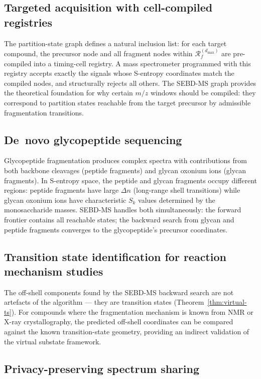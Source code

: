 \documentclass[twocolumn,10pt,a4paper]{article}
\theoremstyle{thmstyle}
\theoremstyle{definition}
\theoremstyle{remark}
\newcommand{\Sk}{S_{k}}
\newcommand{\Reachf}{\mathcal{R}_f}
\begin{document}
\subsection{Targeted acquisition with cell-compiled registries}

The partition-state graph defines a natural inclusion list: for each
target compound, the precursor node and all fragment nodes within
$\Reachf^{(d_\text{max})}$ are pre-compiled into a timing-cell registry.
A mass spectrometer programmed with this registry accepts exactly the
signals whose S-entropy coordinates match the compiled nodes, and
structurally rejects all others. The SEBD-MS graph provides the
theoretical foundation for why certain $m/z$ windows should be compiled:
they correspond to partition states reachable from the target precursor
by admissible fragmentation transitions.

\subsection{De~novo glycopeptide sequencing}

Glycopeptide fragmentation produces complex spectra with contributions
from both backbone cleavages (peptide fragments) and glycan oxonium
ions (glycan fragments). In S-entropy space, the peptide and glycan
fragments occupy different regions: peptide fragments have large $\Delta n$
(long-range shell transitions) while glycan oxonium ions have
characteristic $\Sk$ values determined by the monosaccharide masses.
SEBD-MS handles both simultaneously: the forward frontier contains all
reachable states; the backward search from glycan and peptide fragments
converges to the glycopeptide's precursor coordinates.

\subsection{Transition state identification for reaction mechanism studies}

The off-shell components found by the SEBD-MS backward search are
not artefacts of the algorithm --- they are transition states
(Theorem~\ref{thm:virtual-ts}). For compounds where the fragmentation
mechanism is known from NMR or X-ray crystallography, the predicted
off-shell coordinates can be compared against the known transition-state
geometry, providing an indirect validation of the virtual substate
framework.

\subsection{Privacy-preserving spectrum sharing}
\end{document}
